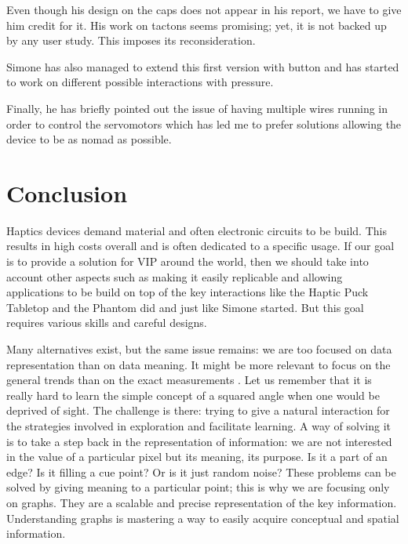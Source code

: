 Even though his design on the caps does not appear in his report, we
have to give him credit for it. His work on tactons seems promising;
yet, it is not backed up by any user study. This imposes its
reconsideration.

Simone has also managed to extend this first version with button and has
started to work on different possible interactions with pressure.

Finally, he has briefly pointed out the issue of having multiple wires
running in order to control the servomotors which has led me to prefer
solutions allowing the device to be as nomad as possible.

\section{Conclusion}\label{conclusion}

Haptics devices demand material and often electronic circuits to be
build. This results in high costs overall and is often dedicated to a
specific usage. If our goal is to provide a solution for VIP around the
world, then we should take into account other aspects such as making it
easily replicable and allowing applications to be build on top of the
key interactions like the Haptic Puck Tabletop and the Phantom did and just like Simone started. But
this goal requires various skills and careful designs.

Many alternatives exist, but the same issue remains: we are too focused
on data representation than on data meaning. It might be more relevant to
focus on the general trends than on the exact measurements \cite{roberts2007we}. Let us
remember that it is really hard to learn the simple concept of a squared
angle when one would be deprived of sight. The challenge is there:
trying to give a natural interaction for the strategies involved in
exploration and facilitate learning. A way of solving it is to take a
step back in the representation of information: we are not interested in
the value of a particular pixel but its meaning, its purpose. Is it a
part of an edge? Is it filling a cue point? Or is it just random noise?
These problems can be solved by giving meaning to a particular point; this
is why we are focusing only on graphs. They are a scalable and precise
representation of the key information. Understanding graphs is mastering
a way to easily acquire conceptual and spatial information.